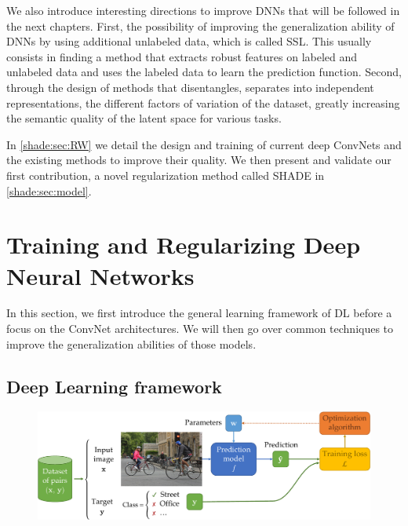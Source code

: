 We also introduce interesting directions to improve \acp{DNN} that will be followed in the next chapters. First, the possibility of improving the generalization ability of \acp{DNN} by using additional unlabeled data, which is called \acf{SSL}. This usually consists in finding a method that extracts robust features on labeled and unlabeled data and uses the labeled data to learn the prediction function. Second, through the design of methods that disentangles, \ie separates into independent representations, the different factors of variation of the dataset, greatly increasing the semantic quality of the latent space for various tasks.

In \autoref{shade:sec:RW} we detail the design and training of current deep \acp{ConvNet} and the existing methods to improve their quality. We then present and validate our first contribution, a novel regularization method called \acs{SHADE} in \autoref{shade:sec:model}.


\section{Training and Regularizing Deep Neural Networks} \label{shade:sec:RW}

In this section, we first introduce the general learning framework of \acf{DL} before a focus on the \acf{ConvNet} architectures. We will then go over common techniques to improve the generalization abilities of those models.

\subsection{Deep Learning framework}

\begin{figure}[tb]
	\centering
	\includegraphics[width=\linewidth]{images/intro_ML}
	\label{shade:fig:ML}
\end{figure}

